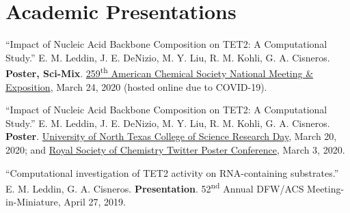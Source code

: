 \documentclass[letterpaper,11pt]{article}
\begin{document}
\section{Academic Presentations}
\begin{etaremune}[start=13]
\small{
  \item \textnormal{``Impact of Nucleic Acid Backbone Composition on TET2: A Computational Study.'' E. M. Leddin, J. E. DeNizio, M. Y. Liu, R. M. Kohli, G. A. Cisneros. \textbf{Poster, Sci-Mix}. \href{https://www.morressier.com/article/impact-nucleic-acid-backbone-composition-tet2-computational-study/5e735fe0cde2b641284a9da2?}{259\textsuperscript{th} American Chemical Society National Meeting \& Exposition}, March 24, 2020 (hosted online due to COVID-19).}
  \item \textnormal{``Impact of Nucleic Acid Backbone Composition on TET2: A Computational Study.'' E. M. Leddin, J. E. DeNizio, M. Y. Liu, R. M. Kohli, G. A. Cisneros. \textbf{Poster}. \href{https://twitter.com/EmLedd1/status/1239679717575360512?s=20}{University of North Texas College of Science Research Day}, March 20, 2020; and \href{https://twitter.com/EmLedd1/status/1234811448720797696?s=20}{Royal Society of Chemistry Twitter Poster Conference}, March 3, 2020.}
  \item \textnormal{``Computational investigation of TET2 activity on RNA-containing substrates.'' E. M. Leddin, G. A. Cisneros. \textbf{Presentation}. 52\textsuperscript{nd} Annual DFW/ACS Meeting-in-Miniature, April 27, 2019.}
}
\end{etaremune}

\newpage
{}
\fancyfoot[C]{\thepage}
\end{document}
